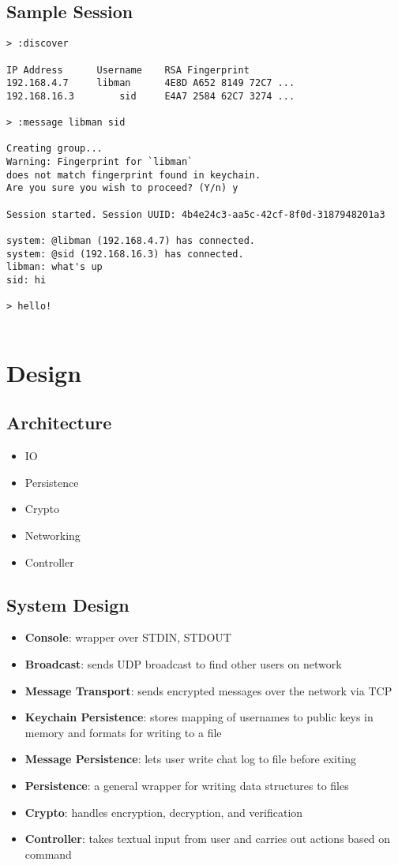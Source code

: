 \documentclass[a4paper]{article}
\begin{document}
\subsection{Sample Session}
\begin{lstlisting}
> :discover

IP Address		Username	RSA Fingerprint
192.168.4.7		libman		4E8D A652 8149 72C7 ...
192.168.16.3		sid		E4A7 2584 62C7 3274 ...

> :message libman sid

Creating group...
Warning: Fingerprint for `libman` 
does not match fingerprint found in keychain.
Are you sure you wish to proceed? (Y/n) y

Session started. Session UUID: 4b4e24c3-aa5c-42cf-8f0d-3187948201a3

system: @libman (192.168.4.7) has connected.
system: @sid (192.168.16.3) has connected.
libman: what's up
sid: hi

> hello!
		

\end{lstlisting}

\section{Design}
\subsection{Architecture}
\begin{itemize}
	\item IO
	\item Persistence
	\item Crypto
	\item Networking
	\item Controller
\end{itemize}

\subsection{System Design}
\begin{itemize}
	\item \textbf{Console}: wrapper over STDIN, STDOUT
	\item \textbf{Broadcast}: sends UDP broadcast to find other users on network
	\item \textbf{Message Transport}: sends encrypted messages over the network via TCP
	\item \textbf{Keychain Persistence}: stores mapping of usernames to public keys in memory and formats for writing to a file 
	\item \textbf{Message Persistence}: lets user write chat log to file before exiting
	\item \textbf{Persistence}: a general wrapper for writing data structures to files
	\item \textbf{Crypto}: handles encryption, decryption, and verification
	\item \textbf{Controller}: takes textual input from user and carries out actions based on command 
\end{itemize}
\end{document}
